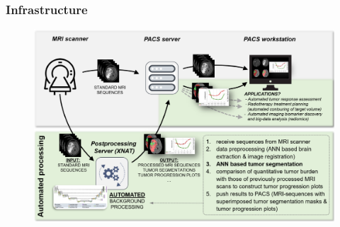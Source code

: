 \documentclass{beamer}
\begin{document}
\begin{frame}
\frametitle{Infrastructure}
\begin{figure}
	\centering
	\includegraphics[width=1.2\textheight]{images/paper_1_infrastructure.png}
\end{figure}
\end{frame}
\end{document}
